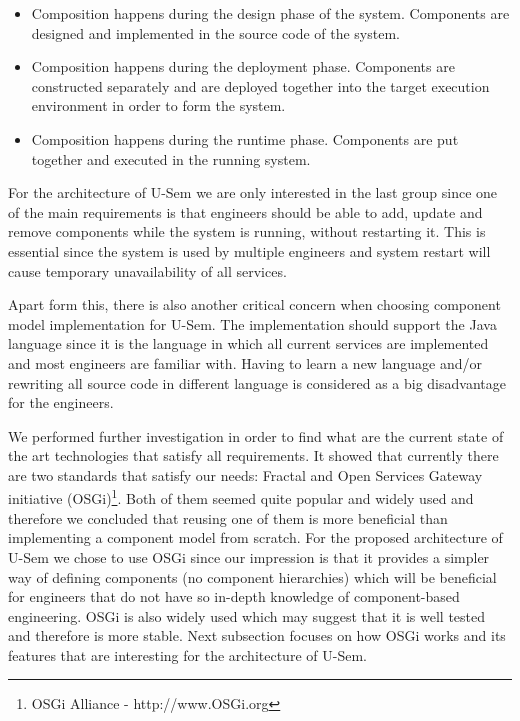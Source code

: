 \begin{itemize}
	\item  Composition happens during the design phase of the system. Components are designed and implemented in the source code of the system.
	\item  Composition happens during the deployment phase. Components are constructed separately and are deployed together into the target execution environment in order to form the system.
	\item Composition happens during the runtime phase. Components are put together and executed in the running system.
\end{itemize}

For the architecture of U-Sem we are only interested in the last group since one of the main requirements is that engineers should be able to add, update and remove components while the system is running, without restarting it. This is essential since the system is used by multiple engineers and system restart will cause temporary unavailability of all services. 

Apart form this, there is also another critical concern when choosing component model implementation for U-Sem. The implementation should support the Java language since it is the language in which all current services are implemented and most engineers are familiar with. Having to learn a new language and/or rewriting all source code in different language is considered as a big disadvantage for the engineers.

We performed further investigation in order to find what are the current state of the art technologies that satisfy all requirements. It showed that currently there are two standards that satisfy our needs: Fractal \cite{bruneton2006fractal} and Open Services Gateway initiative (OSGi)\footnote{OSGi Alliance - http://www.OSGi.org}. Both of them seemed quite popular and widely used and therefore we concluded that reusing one of them is more beneficial than implementing a component model from scratch. For the proposed architecture of U-Sem we chose to use OSGi since our impression is that it provides a simpler way of defining components (no component hierarchies) which will be beneficial for engineers that do not have so in-depth knowledge of component-based engineering. OSGi is also widely used \cite{tavares2008gentle} which may suggest that it is well tested and therefore is more stable. Next subsection focuses on how OSGi works and its features that are interesting for the architecture of U-Sem.


